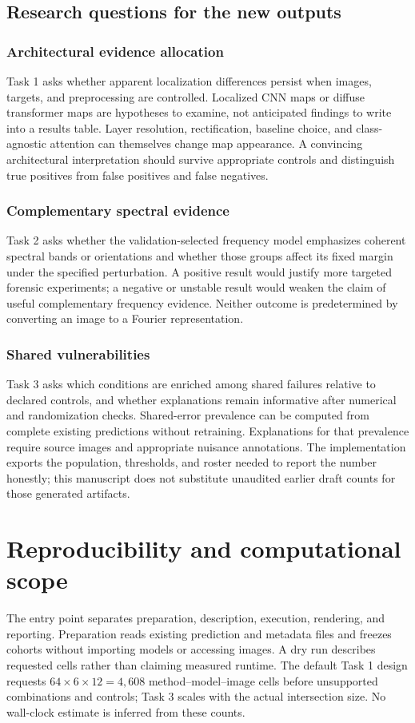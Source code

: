 \documentclass[conference,10pt,letterpaper]{IEEEtran}
\begin{document}
\subsection{Research questions for the new outputs}
\subsubsection{Architectural evidence allocation}
Task 1 asks whether apparent localization differences persist when images, targets, and preprocessing are controlled. Localized CNN maps or diffuse transformer maps are hypotheses to examine, not anticipated findings to write into a results table. Layer resolution, rectification, baseline choice, and class-agnostic attention can themselves change map appearance. A convincing architectural interpretation should survive appropriate controls and distinguish true positives from false positives and false negatives.

\subsubsection{Complementary spectral evidence}
Task 2 asks whether the validation-selected frequency model emphasizes coherent spectral bands or orientations and whether those groups affect its fixed margin under the specified perturbation. A positive result would justify more targeted forensic experiments; a negative or unstable result would weaken the claim of useful complementary frequency evidence. Neither outcome is predetermined by converting an image to a Fourier representation.

\subsubsection{Shared vulnerabilities}
Task 3 asks which conditions are enriched among shared failures relative to declared controls, and whether explanations remain informative after numerical and randomization checks. Shared-error prevalence can be computed from complete existing predictions without retraining. Explanations for that prevalence require source images and appropriate nuisance annotations. The implementation exports the population, thresholds, and roster needed to report the number honestly; this manuscript does not substitute unaudited earlier draft counts for those generated artifacts.

\section{Reproducibility and computational scope}
The entry point separates preparation, description, execution, rendering, and reporting. Preparation reads existing prediction and metadata files and freezes cohorts without importing models or accessing images. A dry run describes requested cells rather than claiming measured runtime. The default Task 1 design requests $64\times6\times12=4{,}608$ method--model--image cells before unsupported combinations and controls; Task 3 scales with the actual intersection size. No wall-clock estimate is inferred from these counts.
\end{document}
